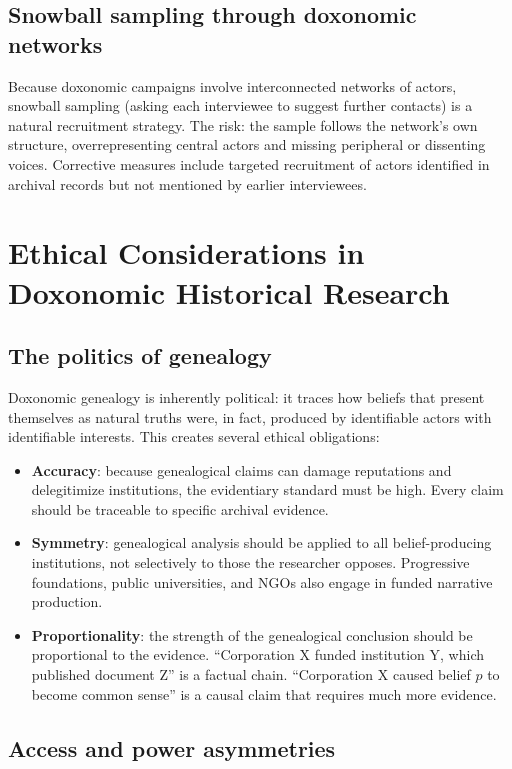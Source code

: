 \subsection{Snowball sampling through doxonomic networks}

Because doxonomic campaigns involve interconnected networks of actors, snowball sampling (asking each interviewee to suggest further contacts) is a natural recruitment strategy.
The risk: the sample follows the network's own structure, overrepresenting central actors and missing peripheral or dissenting voices.
Corrective measures include targeted recruitment of actors identified in archival records but not mentioned by earlier interviewees.

\section{Ethical Considerations in Doxonomic Historical Research}
\label{sec:ch18-ethics}

\subsection{The politics of genealogy}

Doxonomic genealogy is inherently political: it traces how beliefs that present themselves as natural truths were, in fact, produced by identifiable actors with identifiable interests.
This creates several ethical obligations:
\begin{itemize}[nosep]
  \item \textbf{Accuracy}: because genealogical claims can damage reputations and delegitimize institutions, the evidentiary standard must be high.
  Every claim should be traceable to specific archival evidence.
  \item \textbf{Symmetry}: genealogical analysis should be applied to all belief-producing institutions, not selectively to those the researcher opposes.
  Progressive foundations, public universities, and NGOs also engage in funded narrative production.
  \item \textbf{Proportionality}: the strength of the genealogical conclusion should be proportional to the evidence.
  ``Corporation X funded institution Y, which published document Z'' is a factual chain.
  ``Corporation X caused belief $p$ to become common sense'' is a causal claim that requires much more evidence.
\end{itemize}

\subsection{Access and power asymmetries}

